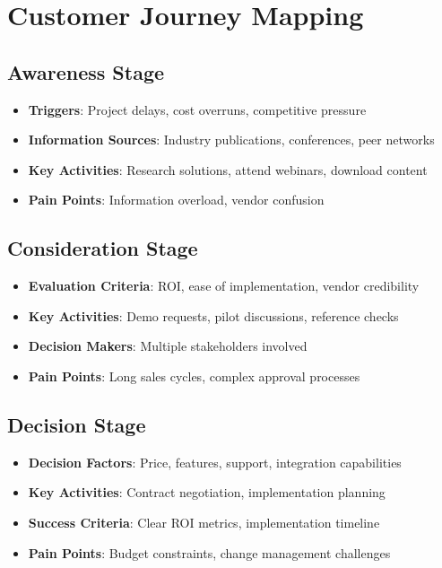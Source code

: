 \documentclass[business]{../templates/infraradar-main}
\begin{document}
\section{Customer Journey Mapping}

\subsection{Awareness Stage}
\begin{itemize}
    \item \textbf{Triggers}: Project delays, cost overruns, competitive pressure
    \item \textbf{Information Sources}: Industry publications, conferences, peer networks
    \item \textbf{Key Activities}: Research solutions, attend webinars, download content
    \item \textbf{Pain Points}: Information overload, vendor confusion
\end{itemize}

\subsection{Consideration Stage}
\begin{itemize}
    \item \textbf{Evaluation Criteria}: ROI, ease of implementation, vendor credibility
    \item \textbf{Key Activities}: Demo requests, pilot discussions, reference checks
    \item \textbf{Decision Makers}: Multiple stakeholders involved
    \item \textbf{Pain Points}: Long sales cycles, complex approval processes
\end{itemize}

\subsection{Decision Stage}
\begin{itemize}
    \item \textbf{Decision Factors}: Price, features, support, integration capabilities
    \item \textbf{Key Activities}: Contract negotiation, implementation planning
    \item \textbf{Success Criteria}: Clear ROI metrics, implementation timeline
    \item \textbf{Pain Points}: Budget constraints, change management challenges
\end{itemize}
\end{document}
